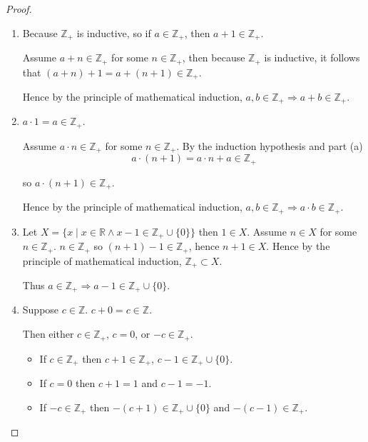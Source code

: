 \begin{proof}
    \begin{enumerate}[label={(\alph*)}]
        \item Because $\mathbb{Z}_{+}$ is inductive, so if $a\in\mathbb{Z}_{+}$, then $a + 1\in\mathbb{Z}_{+}$.

              Assume $a + n\in\mathbb{Z}_{+}$ for some $n\in\mathbb{Z}_{+}$, then because $\mathbb{Z}_{+}$ is inductive, it follows that $(a + n) + 1 = a + (n + 1)\in\mathbb{Z}_{+}$.

              Hence by the principle of mathematical induction, $a, b\in\mathbb{Z}_{+}\Rightarrow a + b\in\mathbb{Z}_{+}$.
        \item $a\cdot 1 = a\in\mathbb{Z}_{+}$.

              Assume $a\cdot n\in\mathbb{Z}_{+}$ for some $n\in\mathbb{Z}_{+}$. By the induction hypothesis and part (a)
              \[
                  a\cdot (n + 1) = a\cdot n + a \in\mathbb{Z}_{+}
              \]

              so $a\cdot (n + 1)\in\mathbb{Z}_{+}$.

              Hence by the principle of mathematical induction, $a, b\in\mathbb{Z}_{+}\Rightarrow a\cdot b\in\mathbb{Z}_{+}$.
        \item Let $X = \{ x \mid x\in\mathbb{R} \land x - 1\in\mathbb{Z}_{+}\cup\{ 0 \} \}$ then $1\in X$. Assume $n\in X$ for some $n\in\mathbb{Z}_{+}$. $n\in\mathbb{Z}_{+}$ so $(n + 1) - 1\in\mathbb{Z}_{+}$, hence $n + 1\in X$. Hence by the principle of mathematical induction, $\mathbb{Z}_{+}\subset X$.

              Thus $a\in\mathbb{Z}_{+} \Rightarrow a - 1\in\mathbb{Z}_{+}\cup\{0\}$.
        \item Suppose $c\in\mathbb{Z}$. $c + 0 = c\in\mathbb{Z}$.

              Then either $c\in\mathbb{Z}_{+}$, $c = 0$, or $-c\in\mathbb{Z}_{+}$.
              \begin{itemize}[itemsep=0pt]
                  \item If $c\in\mathbb{Z}_{+}$ then $c + 1\in\mathbb{Z}_{+}$, $c - 1\in\mathbb{Z}_{+}\cup\{0\}$.
                  \item If $c = 0$ then $c + 1 = 1$ and $c - 1 = -1$.
                  \item If $-c \in\mathbb{Z}_{+}$ then $-(c+1)\in\mathbb{Z}_{+}\cup\{0\}$ and $-(c - 1)\in\mathbb{Z}_{+}$.
              \end{itemize}


\end{enumerate}
\end{proof}
